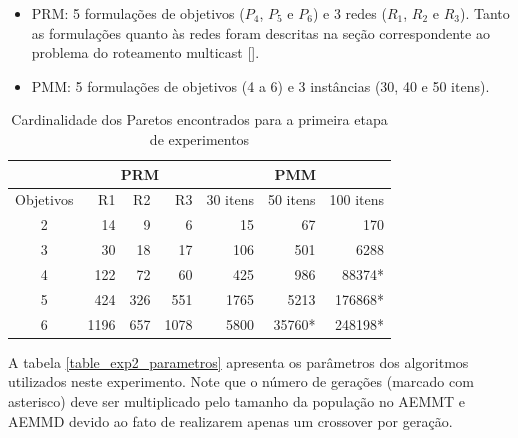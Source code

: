 \begin{itemize}
	\item PRM: 5 formulações de objetivos ($P_4$, $P_5$ e $P_6$) e 3 redes ($R_1$, $R_2$ e $R_3$). Tanto as formulações quanto às redes foram descritas na seção correspondente ao problema do roteamento multicast [].
	\item PMM: 5 formulações de objetivos (4 a 6) e 3 instâncias (30, 40 e 50 itens).
\end{itemize}


\begin{table}[!htbp]
	\centering
	\caption{Cardinalidade dos Paretos encontrados para a primeira etapa de experimentos}
	\label{table_exp2_paretos}
	\begin{tabular}{c|rrr|rrr}
		& \multicolumn{3}{c|}{\textbf{PRM}} & \multicolumn{3}{c}{\textbf{PMM}} \\ \hline
		Objetivos & R1         & R2       & R3        & 30 itens  & 50 itens & 100 itens \\ \hline
		2         & 14         & 9        & 6         & 15        & 67       & 170       \\
		3         & 30         & 18       & 17        & 106       & 501      & 6288      \\
		4         & 122        & 72       & 60        & 425       & 986      & 88374*    \\
		5         & 424        & 326      & 551       & 1765      & 5213     & 176868*   \\
		6         & 1196       & 657      & 1078      & 5800      & 35760*   & 248198*   \\ \hline
	\end{tabular}
\end{table}

A tabela \ref{table_exp2_parametros} apresenta os parâmetros dos algoritmos utilizados neste experimento. Note que o número de gerações (marcado com asterisco) deve ser multiplicado pelo tamanho da população no AEMMT e AEMMD devido ao fato de realizarem apenas um crossover por geração.

